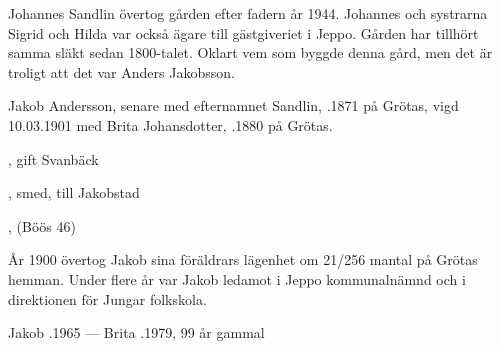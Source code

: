 


Johannes Sandlin övertog gården efter fadern år 1944. Johannes och systrarna Sigrid och Hilda var också ägare till gästgiveriet i Jeppo. Gården har tillhört samma släkt sedan 1800-talet. Oklart vem som byggde denna gård, men det är troligt att det var Anders Jakobsson.


Jakob Andersson, senare med efternamnet Sandlin, .1871 på Grötas, vigd 10.03.1901 med Brita Johansdotter, .1880 på Grötas.
\begin{jhchildren}
  \item {}
  \item {}
  \item {}, gift Svanbäck
  \item {}
  \item {}
  \item {}, smed, till Jakobstad
  \item {}, (Böös 46)
  \item {}
  \item {}
  \item {}
\end{jhchildren}

År 1900 övertog Jakob sina föräldrars lägenhet om  21/256 mantal på Grötas hemman. Under flere år var Jakob ledamot i Jeppo kommunalnämnd och i direktionen för Jungar folkskola.

Jakob .1965  ---  Brita .1979, 99 år gammal


